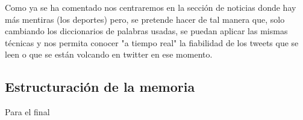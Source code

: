 \documentclass[../all.tex]{subfiles}
\begin{document}
    Como ya se ha comentado nos centraremos en la sección de noticias donde hay más mentiras (los deportes) pero, se pretende hacer de tal manera que, solo cambiando los diccionarios de palabras usadas, se puedan aplicar las mismas técnicas y nos permita conocer "a tiempo real" la fiabilidad de los tweets que se leen o que se están volcando en twitter en ese momento. 

\newpage
\subsection{Estructuración de la memoria}
{\color{red} Para el final}
\end{document}
